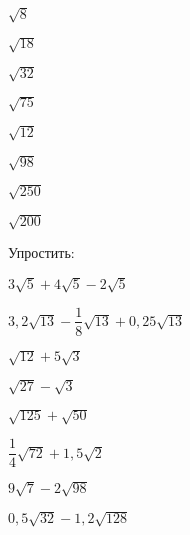 \begin{class}[number=3]
\begin{listofex}
		\begin{enumcols}[itemcolumns=8]
			\item \( \sqrt{8} \)
			\item \( \sqrt{18} \)
			\item \( \sqrt{32} \)
			\item \( \sqrt{75} \)
			\item \( \sqrt{12} \)
			\item \( \sqrt{98} \)
			\item \( \sqrt{250} \)
			\item \( \sqrt{200} \)
		\end{enumcols}
		\item Упростить:
		\begin{enumcols}[itemcolumns=2]
			\item \( 3\sqrt{5}+4\sqrt{5}-2\sqrt{5} \)
			\item \( 3,2\sqrt{13}-\dfrac{1}{8}\sqrt{13}+0,25\sqrt{13} \)
			\item \( \sqrt{12}+5\sqrt{3} \)
			\item \( \sqrt{27}-\sqrt{3} \)
			\item \( \sqrt{125}+\sqrt{50} \)
			\item \( \dfrac{1}{4}\sqrt{72}+1,5\sqrt{2} \)
			\item \( 9\sqrt{7}-2\sqrt{98} \)
			\item \( 0,5\sqrt{32}-1,2\sqrt{128} \)
			

\end{enumcols}
\end{listofex}
\end{class}
